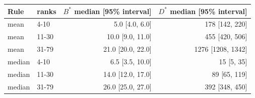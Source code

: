 \begin{tabular}{@{}llrr@{}}\toprule
Rule & ranks & $B^\ast$ median [95\% interval] & $D^\ast$ median [95\% interval]\\\midrule
mean & 4-10 & 5.0 [4.0, 6.0] & 178 [142, 220]\\
mean & 11-30 & 10.0 [9.0, 11.0] & 455 [420, 506]\\
mean & 31-79 & 21.0 [20.0, 22.0] & 1276 [1208, 1342]\\
median & 4-10 & 6.5 [3.5, 10.0] & 15 [5, 35]\\
median & 11-30 & 14.0 [12.0, 17.0] & 89 [65, 119]\\
median & 31-79 & 26.0 [25.0, 27.0] & 392 [348, 450]\\
\bottomrule\end{tabular}
